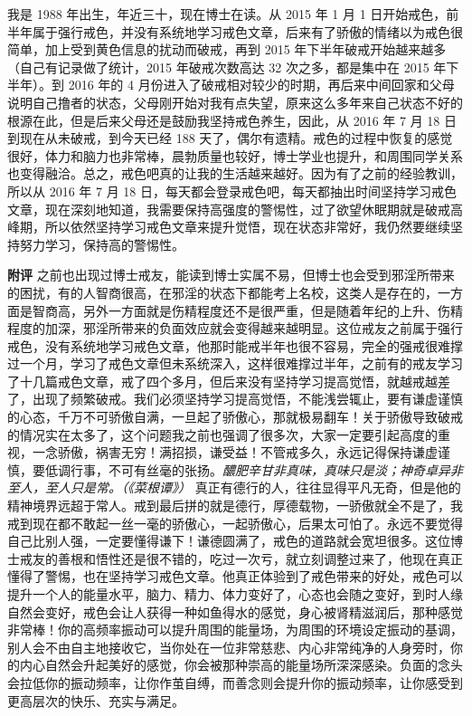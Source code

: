 \begin{case}
    我是 1988 年出生，年近三十，现在博士在读。从 2015 年 1 月 1 日开始戒色，前半年属于强行戒色，并没有系统地学习戒色文章，后来有了骄傲的情绪以为戒色很简单，加上受到黄色信息的扰动而破戒，再到 2015 年下半年破戒开始越来越多（自己有记录做了统计，2015 年破戒次数高达 32 次之多，都是集中在 2015 年下半年）。到 2016 年的 4 月份进入了破戒相对较少的时期，再后来中间回家和父母说明自己撸者的状态，父母刚开始对我有点失望，原来这么多年来自己状态不好的根源在此，但是后来父母还是鼓励我坚持戒色养生，因此，从 2016 年 7 月 18 日到现在从未破戒，到今天已经 188 天了，偶尔有遗精。戒色的过程中恢复的感觉很好，体力和脑力也非常棒，晨勃质量也较好，博士学业也提升，和周围同学关系也变得融洽。总之，戒色吧真的让我的生活越来越好。因为有了之前的经验教训，所以从 2016 年 7 月 18 日，每天都会登录戒色吧，每天都抽出时间坚持学习戒色文章，现在深刻地知道，我需要保持高强度的警惕性，过了欲望休眠期就是破戒高峰期，所以依然坚持学习戒色文章来提升觉悟，现在状态非常好，我仍然要继续坚持努力学习，保持高的警惕性。

    \textbf{附评} 之前也出现过博士戒友，能读到博士实属不易，但博士也会受到邪淫所带来的困扰，有的人智商很高，在邪淫的状态下都能考上名校，这类人是存在的，一方面是智商高，另外一方面就是伤精程度还不是很严重，但是随着年纪的上升、伤精程度的加深，邪淫所带来的负面效应就会变得越来越明显。这位戒友之前属于强行戒色，没有系统地学习戒色文章，他那时能戒半年也很不容易，完全的强戒很难撑过一个月，学习了戒色文章但未系统深入，这样很难撑过半年，之前有的戒友学习了十几篇戒色文章，戒了四个多月，但后来没有坚持学习提高觉悟，就越戒越差了，出现了频繁破戒。我们必须坚持学习提高觉悟，不能浅尝辄止，要有谦虚谨慎的心态，千万不可骄傲自满，一旦起了骄傲心，那就极易翻车！关于骄傲导致破戒的情况实在太多了，这个问题我之前也强调了很多次，大家一定要引起高度的重视，一念骄傲，祸害无穷！满招损，谦受益！不管戒多久，永远记得保持谦虚谨慎，要低调行事，不可有丝毫的张扬。\textit{醲肥辛甘非真味，真味只是淡；神奇卓异非至人，至人只是常。（《菜根谭》）} 真正有德行的人，往往显得平凡无奇，但是他的精神境界远超于常人。戒到最后拼的就是德行，厚德载物，一骄傲就全不是了，我戒到现在都不敢起一丝一毫的骄傲心，一起骄傲心，后果太可怕了。永远不要觉得自己比别人强，一定要懂得谦下！谦德圆满了，戒色的道路就会宽坦很多。这位博士戒友的善根和悟性还是很不错的，吃过一次亏，就立刻调整过来了，他现在真正懂得了警惕，也在坚持学习戒色文章。他真正体验到了戒色带来的好处，戒色可以提升一个人的能量水平，脑力、精力、体力变好了，心态也会随之变好，到时人缘自然会变好，戒色会让人获得一种如鱼得水的感觉，身心被肾精滋润后，那种感觉非常棒！你的高频率振动可以提升周围的能量场，为周围的环境设定振动的基调，别人会不由自主地接收它，当你处在一位非常慈悲、内心非常纯净的人身旁时，你的内心自然会升起美好的感觉，你会被那种崇高的能量场所深深感染。负面的念头会拉低你的振动频率，让你作茧自缚，而善念则会提升你的振动频率，让你感受到更高层次的快乐、充实与满足。
\end{case}

